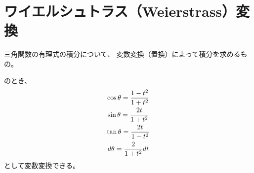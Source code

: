 \newpage
\section{ワイエルシュトラス（Weierstrass）変換}
三角関数の有理式の積分について、
変数変換（置換）によって積分を求めるもの。
\begin{screen}
  のとき、
  \begin{gather}
    \cos {\theta} = \frac{1-t^2}{1+t^2} \\
    \sin {\theta} = \frac{2t}{1+t^2} \\
    \tan {\theta} = \frac{2t}{1-t^2} \\
    d{\theta} = \frac{2}{1+t^2}dt
  \end{gather}
  として変数変換できる。
\end{screen}
